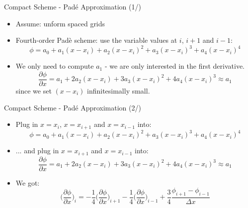 
\begin{frame}{Compact Scheme - Pad\'e Approximation (1/)}
\begin{itemize}
    \item Assume: unform spaced grids
    \item Fourth-order Pad\`e scheme: use the variable values at $i$, $i+1$ and $i-1$:
    \[\phi = a_{0}+a_{1}(x-x_{i})+a_{2}(x-x_{i})^{2}+a_{3}(x-x_{i})^{3}+a_{4}(x-x_{i})^{4}\]
    \item We only need to compute $a_{1}$ - we are only interested in the first derivative.
    \[\frac{\partial \phi}{\partial x} = a_{1}+2a_{2}(x-x_{i})+ 3a_{3}(x-x_{i})^{2}+4a_{4}(x-x_{i})^{3} \approx a_{1}\]
    since we set $(x-x_{i})$ infinitesimally small.
\end{itemize}
\end{frame}


\begin{frame}{Compact Scheme - Pad\'e Approximation (2/)}

\begin{itemize}
    \item Plug in $x=x_{i}$, $x=x_{i+1}$ and $x=x_{i-1}$ into:
    \begin{equation*}
        \boxed{\phi = a_{0}+a_{1}(x-x_{i})+a_{2}(x-x_{i})^{2}+a_{3}(x-x_{i})^{3}+a_{4}(x-x_{i})^{4}}
    \end{equation*}

    \item ... and plug in $x=x_{i+1}$ and $x=x_{i-1}$ into:
    \begin{equation*}
        \boxed{\frac{\partial \phi}{\partial x} = a_{1}+2a_{2}(x-x_{i})+ 3a_{3}(x-x_{i})^{2}+4a_{4}(x-x_{i})^{3} \approx a_{1}}
    \end{equation*}
    
    \item We got: 
    \[\bigg( \frac{\partial \phi}{\partial x}\bigg)_{i} = -\frac{1}{4}\bigg( \frac{\partial \phi}{\partial x}\bigg)_{i+1} - \frac{1}{4}\bigg( \frac{\partial \phi}{\partial x}\bigg)_{i-1} + \frac{3}{4}\frac{\phi_{i+1}-\phi_{i-1}}{\Delta x}\]
\end{itemize}
\end{frame}


